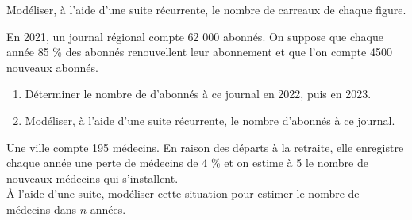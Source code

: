 \documentclass[a4paper,11pt,exos]{nsi} %
\begin{document}


Modéliser, à l'aide d'une suite récurrente, le nombre de carreaux de chaque figure.

\exo{}
En 2021, un journal régional compte 62 000 abonnés. On suppose que chaque année 85 \% des abonnés renouvellent leur abonnement et que l'on compte 4500 nouveaux abonnés.
\begin{enumerate}
	\item 	Déterminer le nombre de d'abonnés à ce journal en 2022, puis en 2023.
	\item 	Modéliser, à l'aide d'une suite récurrente, le nombre d'abonnés à ce journal.
\end{enumerate}


\exo{}
Une ville compte 195 médecins. En raison des départs à la retraite, elle enregistre chaque année une perte de médecins de 4 \% et on estime à 5 le nombre de nouveaux médecins qui s'installent.\\
À l'aide d'une suite, modéliser cette situation pour estimer le nombre de médecins dans $n$ années.\\



\end{document}
